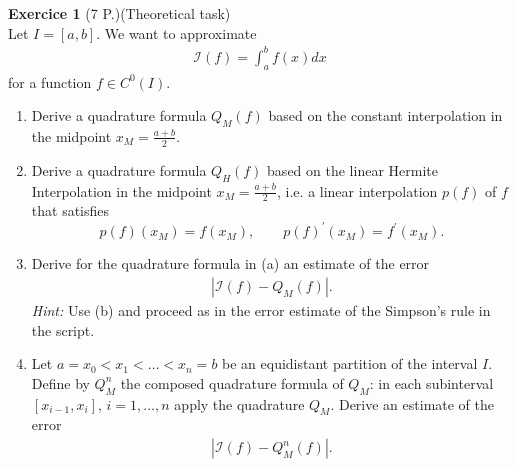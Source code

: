 \documentclass[11pt,a4paper,german]{scrartcl}
\theoremstyle{break}   %
\begin{document}
  
\vspace{10ex}
\textbf{Exercice 1} (7 P.)(Theoretical task)\\
Let \(I=[a,b]\). We want to approximate 
\begin{align*}
\mathcal{I}(f) = \int_a^b f(x) dx
\end{align*}
for a function \(f\in C^0(I)\).
\begin{enumerate}
\item Derive a quadrature formula \(Q_M(f)\) based on the constant interpolation in the midpoint \(x_M= \frac{a+b}{2}.\)
\item Derive a quadrature formula \(Q_H(f)\) based on the linear Hermite Interpolation in the midpoint \(x_M= \frac{a+b}{2}\), i.e. a linear interpolation \(p(f)\) of \(f\) that satisfies \[p(f)(x_M) = f(x_M), \qquad p(f)^\prime(x_M) = f^\prime (x_M).\]
\item Derive for the quadrature formula in (a) an estimate of the error 
\begin{align*}
|\mathcal{I}(f) - Q_M(f)|.
\end{align*}
\textit{Hint:} Use (b) and proceed as in the error estimate of the Simpson's rule in the script.
\item Let \(a=x_0<x_1<\ldots<x_n = b\) be an equidistant partition of the interval \(I\). Define by \(Q_M^n\) the composed quadrature formula of \(Q_M\): in each subinterval \([x_{i-1},x_{i}]\), \(i = 1, \ldots, n\) apply the quadrature \(Q_M\). Derive an estimate of the error 
\begin{align*}
|\mathcal{I}(f) - Q_M^n(f)|.
\end{align*}
\end{enumerate}
\end{document}
